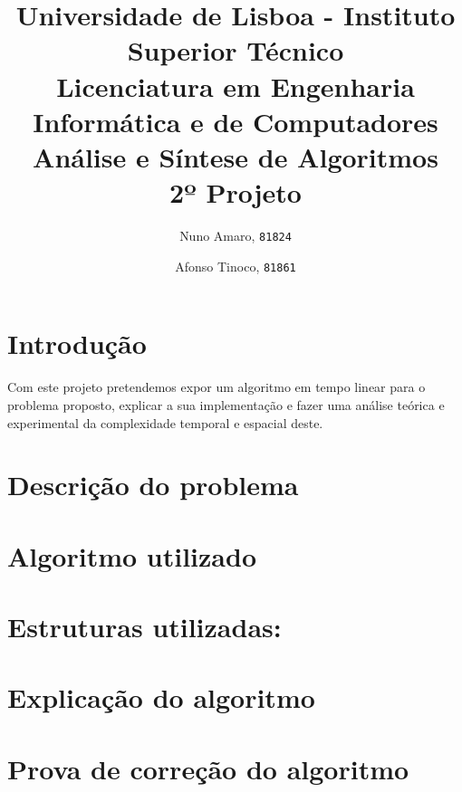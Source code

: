 \documentclass{scrartcl}
\begin{document}

\title{
	\textnormal{
	\LARGE Universidade de Lisboa - Instituto Superior Técnico\\
	\Large Licenciatura em Engenharia Informática e de Computadores\\
	\Large Análise e Síntese de Algoritmos
\\}
	\LARGE2º Projeto
	\vspace{-1ex}
	}
\author{Nuno Amaro,
	\texttt{81824}
	\and
	Afonso Tinoco,
	\texttt{81861}
}
\date{	\vspace{-1ex}
		\vspace{-4ex}
	}
\maketitle
\section*{Introdução}
Com este projeto pretendemos expor um algoritmo em tempo linear para o problema proposto, explicar a sua implementação e fazer uma análise teórica e experimental da complexidade temporal e espacial deste.

\section*{Descrição do problema}

\section*{Algoritmo utilizado}

\section*{Estruturas utilizadas:}

\section*{Explicação do algoritmo}

\section*{Prova de correção do algoritmo}
\end{document}
